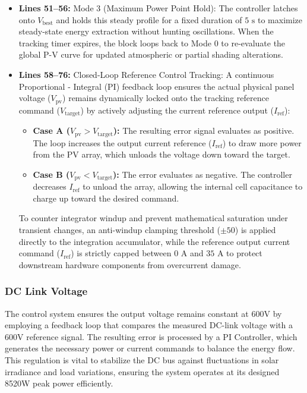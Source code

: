 \begin{itemize}
    \item \textbf{Lines 51--56:} Mode 3 (Maximum Power Point Hold): The controller latches onto $V_{\text{best}}$ and holds this steady profile for a fixed duration of $5\text{ s}$ to maximize steady-state energy extraction without hunting oscillations. When the tracking timer expires, the block loops back to Mode 0 to re-evaluate the global P-V curve for updated atmospheric or partial shading alterations.
    
    \item \textbf{Lines 58--76:} Closed-Loop Reference Control Tracking: A continuous Proportional - Integral (PI) feedback loop ensures the actual physical panel voltage ($V_{\text{pv}}$) remains dynamically locked onto the tracking reference command ($V_{\text{target}}$) by actively adjusting the current reference output ($I_{\text{ref}}$):
    \begin{itemize}
        \item \textbf{Case A ($V_{\text{pv}} > V_{\text{target}}$):} The resulting error signal evaluates as positive. The loop increases the output current reference ($I_{\text{ref}}$) to draw more power from the PV array, which unloads the voltage down toward the target.
        \item \textbf{Case B ($V_{\text{pv}} < V_{\text{target}}$):} The error evaluates as negative. The controller decreases $I_{\text{ref}}$ to unload the array, allowing the internal cell capacitance to charge up toward the desired command.
    \end{itemize}
    To counter integrator windup and prevent mathematical saturation under transient changes, an anti-windup clamping threshold ($\pm 50$) is applied directly to the integration accumulator, while the reference output current command ($I_{\text{ref}}$) is strictly capped between $0\text{ A}$ and $35\text{ A}$ to protect downstream hardware components from overcurrent damage.
\end{itemize}
\newpage
\subsubsection{DC Link Voltage}
The control system ensures the output voltage remains constant at 600V by employing a feedback loop that compares the measured DC-link voltage with a 600V reference signal. The resulting error is processed by a PI Controller, which generates the necessary power or current commands to balance the energy flow. This regulation is vital to stabilize the DC bus against fluctuations in solar irradiance and load variations, ensuring the system operates at its designed 8520W peak power efficiently.


